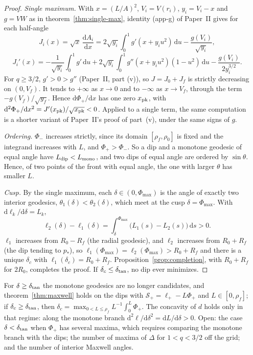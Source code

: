 \documentclass[aip,jmp,amsmath,amssymb,reprint]{revtex4-2}
\newcommand{\dd}{\mathrm{d}}
\theoremstyle{plain}
\theoremstyle{definition}
\begin{document}
\begin{proof}
\emph{Single maximum.} With $x=(L/A)^2$, $V_i=V(r_i)$, $y_i=V_i-x$ and $g=VW$ as in
theorem~\ref{thm:single-max}, identity (app-g) of Paper~II gives for each half-angle
\[
  J_i(x)=\sqrt x\,\frac{\dd A_i}{\dd x}
  =2\sqrt{y_i}\int_0^1g'(x+y_iu^2)\,\dd u-\frac{g(V_i)}{\sqrt{y_i}},
\]
\[
  J_i'(x)=-\frac1{\sqrt{y_i}}\int_0^1g'\,\dd u
  +2\sqrt{y_i}\int_0^1g''(x+y_iu^2)(1-u^2)\,\dd u-\frac{g(V_i)}{2y_i^{3/2}} .
\]
For $q\ge3/2$, $g'>0>g''$ (Paper~II, part (v)), so $J=J_0+J_f$ is strictly decreasing on
$(0,V_f)$. It tends to $+\infty$ as $x\to0$ and to $-\infty$ as $x\to V_f$, through the term
$-g(V_f)/\sqrt{y_f}$. Hence $\dd\Phi_+/\dd x$ has one zero $x_{\rm pk}$, with
$\dd^2\Phi_+/\dd x^2=J'(x_{\rm pk})/\sqrt{x_{\rm pk}}<0$. Applied to a single term, the same
computation is a shorter variant of Paper~II's proof of part~(v), under the same signs of $g$.

\emph{Ordering.} $\Phi_-$ increases strictly, since its domain $[\rho_f,\rho_0]$ is fixed and
the integrand increases with $L$, and $\Phi_+>\Phi_-$. So a dip and a monotone geodesic of
equal angle have $L_{\rm dip}<L_{\rm mono}$, and two dips of equal angle are ordered by
$\sin\theta$. Hence, of two points of the front with equal angle, the one with larger $\theta$
has smaller $L$.

\emph{Cusp.} By the single maximum, each $\delta\in(0,\Phi_{\max})$ is the angle of exactly two
interior geodesics, $\theta_1(\delta)<\theta_2(\delta)$, which meet at the cusp
$\delta=\Phi_{\max}$. With $\dd\ell_k/\dd\delta=L_k$,
\[
  \ell_2(\delta)-\ell_1(\delta)=\int_\delta^{\Phi_{\max}}\bigl(L_1(s)-L_2(s)\bigr)\,\dd s>0 .
\]
$\ell_1$ increases from $R_0-R_f$ (the radial geodesic), and $\ell_2$ increases from $R_0+R_f$
(the dip tending to $p_*$), so $\ell_1(\Phi_{\max})=\ell_2(\Phi_{\max})>R_0+R_f$ and there is a
unique $\delta_c$ with $\ell_1(\delta_c)=R_0+R_f$. Proposition~\ref{prop:completion}, with
$R_0+R_f$ for $2R_0$, completes the proof. If $\delta_c\le\delta_{\rm tan}$, no dip ever
minimizes.
\end{proof}

For $\delta\ge\delta_{\rm tan}$ the monotone geodesics are no longer candidates, and
theorem~\ref{thm:maxwell} holds on the dips with $\mathcal S_+=\ell_+-L\Phi_+$ and $L\in[0,\rho_f]$;
if $\delta_c\ge\delta_{\rm tan}$, then $\delta_c=\max_{0<L\le\rho_f}L^{-1}\int_0^L\Phi_+$. The
concavity of $d$ holds only in that regime: along the monotone branch
$\dd^2\ell/\dd\delta^2=\dd L/\dd\delta>0$. Open: the case $\delta<\delta_{\rm tan}$ when $\Phi_+$ has
several maxima, which requires comparing the monotone branch with the dips; the number of
maxima of $\Delta$ for $1<q<3/2$ off the grid; and the number of interior Maxwell angles.
\end{document}
